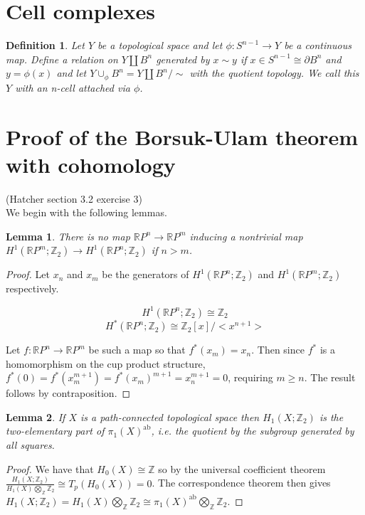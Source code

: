 \documentclass{report}
\newtheorem{definition}{Definition}
\newtheorem{lemma}{Lemma}
\begin{document}
\section{Cell complexes}
\begin{definition}
Let $Y$ be a topological space and let $\phi\colon S^{n-1}\to Y$ be a continuous map. Define a relation on $Y\coprod B^n$ generated by $x\sim y$ if $x\in S^{n-1}\cong\partial B^n$ and $y=\phi(x)$ and let $Y\cup_\phi B^n=Y\coprod B^n/\sim$ with the quotient topology. We call this $Y$ with an n-cell attached via $\phi$.
\end{definition}


\section{Proof of the Borsuk-Ulam theorem with cohomology}

\textrm{(Hatcher section 3.2 exercise 3) \\}
We begin with the following lemmas.

\begin{lemma}
There is no map $\mathbb{R} P^n$$\rightarrow$$\mathbb{R} P^m$ inducing a nontrivial map $H^1(\mathbb{R} P^m;\mathbb{Z}_2)\rightarrow H^1(\mathbb{R} P^n;\mathbb{Z}_2)$ if $n>m$.
\end{lemma}
\begin{proof}
Let $x_n$ and $x_m$ be the generators of $H^1(\mathbb{R} P^n;\mathbb{Z}_2)$ and $H^1(\mathbb{R} P^m;\mathbb{Z}_2)$ respectively.

\[H^1(\mathbb{R} P^n;\mathbb{Z}_2)\cong \mathbb{Z}_2\] 
\[H^*(\mathbb{R} P^n;\mathbb{Z}_2)\cong \mathbb{Z}_2[x]/<x^{n+1}>\] 

\noindent Let $f\colon\mathbb{R} P^n\to\mathbb{R} P^m $ be such a map so that $f^*(x_m)=x_n$.
Then since $f^*$ is a homomorphism on the cup product structure, $f^*(0)=f^*(x_m^{m+1})=f^*(x_m)^{m+1}=x_n^{m+1}=0$, requiring $m \geq n$. The result follows by contraposition.
\end{proof}

\begin{lemma}
If $X$ is a path-connected topological space then $H_1(X;\mathbb{Z}_2)$ is the two-elementary part of $\pi_1(X)^{\text{ab}}$, i.e. the quotient by the subgroup generated by all squares.
\end{lemma}
\begin{proof}
We have that $H_0(X)\cong\mathbb{Z}$ so by the universal coefficient theorem $\frac{H_1(X;\mathbb{Z}_2)}{H_1(X)\bigotimes_\mathbb{Z}\mathbb{Z}_2}\cong T_p(H_0(X))=0$. The correspondence theorem then gives $H_1(X;\mathbb{Z}_2)=H_1(X)\bigotimes_\mathbb{Z}\mathbb{Z}_2\cong\pi_1(X)^{\text{ab}}\bigotimes_\mathbb{Z}\mathbb{Z}_2$.
\end{proof}
\end{document}
